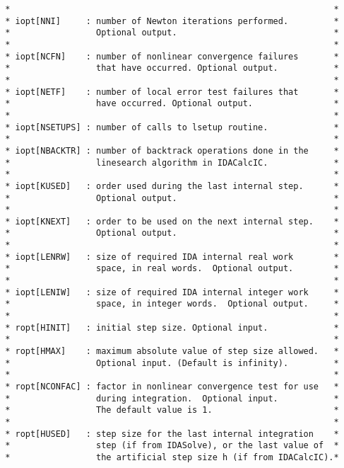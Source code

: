 \begin{verbatim}
 *                                                                *
 * iopt[NNI]     : number of Newton iterations performed.         *
 *                 Optional output.                               *
 *                                                                *
 * iopt[NCFN]    : number of nonlinear convergence failures       *
 *                 that have occurred. Optional output.           *
 *                                                                *
 * iopt[NETF]    : number of local error test failures that       *
 *                 have occurred. Optional output.                *
 *                                                                *
 * iopt[NSETUPS] : number of calls to lsetup routine.             *
 *                                                                *
 * iopt[NBACKTR] : number of backtrack operations done in the     *
 *                 linesearch algorithm in IDACalcIC.             *
 *                                                                *
 * iopt[KUSED]   : order used during the last internal step.      *
 *                 Optional output.                               *
 *                                                                *
 * iopt[KNEXT]   : order to be used on the next internal step.    *
 *                 Optional output.                               *
 *                                                                *
 * iopt[LENRW]   : size of required IDA internal real work        *
 *                 space, in real words.  Optional output.        *
 *                                                                *
 * iopt[LENIW]   : size of required IDA internal integer work     *
 *                 space, in integer words.  Optional output.     *
 *                                                                *
 * ropt[HINIT]   : initial step size. Optional input.             *
 *                                                                *
 * ropt[HMAX]    : maximum absolute value of step size allowed.   *
 *                 Optional input. (Default is infinity).         *
 *                                                                *
 * ropt[NCONFAC] : factor in nonlinear convergence test for use   *
 *                 during integration.  Optional input.           *
 *                 The default value is 1.                        *
 *                                                                *
 * ropt[HUSED]   : step size for the last internal integration    *
 *                 step (if from IDASolve), or the last value of  *
 *                 the artificial step size h (if from IDACalcIC).*

\end{verbatim}
